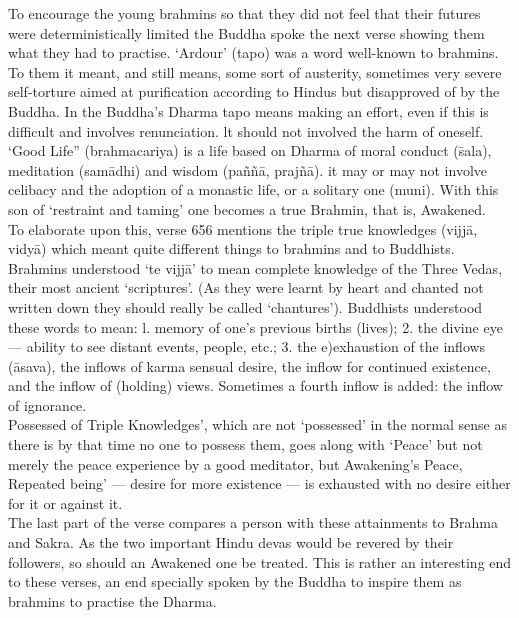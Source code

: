 To encourage the young brahmins so that they did not feel that their futures were deterministically limited the Buddha spoke the next verse showing them what they had to practise. `Ardour' (tapo) was a word well-known to brahmins. To them it meant, and still means, some sort of austerity, sometimes very severe self-torture aimed at purification according to Hindus but disapproved of by the Buddha. In the Buddha's Dharma tapo means making an effort, even if this is difficult and involves renunciation. lt should not involved the harm of oneself. `Good Life” (brahmacariya) is a life based on Dharma of moral conduct
(\=sala), meditation (sam\=adhi) and wisdom (pa\~n\~n\=a, praj\~n\=a). it may or may not involve celibacy and the adoption of a monastic life, or a solitary one (muni). With this son of `restraint and taming' one becomes a true Brahmin, that is, Awakened.\\

To elaborate upon this, verse 656 mentions the triple true knowledges (vijj\=a, vidy\=a) which meant quite different things to brahmins and to Buddhists. Brahmins understood `te vijj\=a' to mean complete knowledge of the Three Vedas, their most ancient `scriptures'. (As they were learnt by heart and chanted not written down they should really be called `chantures'). Buddhists understood these words to mean: l. memory of one's previous births (lives); 2. the divine eye — ability to see distant events, people, etc.; 3. the e)exhaustion of the inﬂows (\=asava), the inﬂows of karma sensual desire, the inflow for continued existence, and the inflow of (holding) views. Sometimes a fourth inflow is added: the inflow of ignorance.\\

Possessed of Triple Knowledges', which are not `possessed' in the normal sense as there is by that time no one to possess them, goes along with `Peace' but not merely the peace experience by a good meditator, but Awakening's Peace, Repeated being' — desire for more existence — is exhausted with no desire either for it or against it.\\

The last part of the verse compares a person with these attainments to Brahma and Sakra. As the two important Hindu devas would be revered by their followers, so should an Awakened one be treated. This is rather an interesting end to these verses, an end specially spoken by the Buddha to inspire them as brahmins to practise the Dharma.


